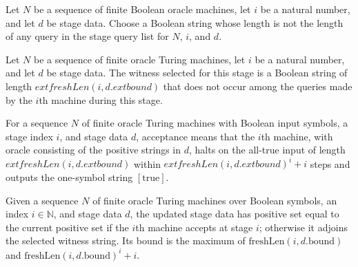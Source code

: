 \begin{definition}
\label{Complexity.stageWit}
\leanok
{}
Let $N$ be a sequence of finite Boolean oracle machines, let $i$ be a natural number,
and let $d$ be stage data. Choose a Boolean string whose length is not the length of any
query in the stage query list for $N$, $i$, and $d$.
\end{definition}

\begin{theorem}
\label{Complexity.stageWit_spec}
\leanok
{}
Let $N$ be a sequence of finite oracle Turing machines, let $i$ be a natural number, and
let $d$ be stage data. The witness selected for this stage is a Boolean string of length
$	ext{freshLen}(i,d.	ext{bound})$ that does not occur among the queries made by the
$i$th machine during this stage.
\end{theorem}

\begin{definition}
\label{Complexity.StageAccepts}
\leanok
{}
For a sequence $N$ of finite oracle Turing machines with Boolean input symbols, a stage
index $i$, and stage data $d$, acceptance means that the $i$th machine, with oracle
consisting of the positive strings in $d$, halts on the all-true input of length
$	ext{freshLen}(i,d.	ext{bound})$ within $	ext{freshLen}(i,d.	ext{bound})^i+i$ steps and
outputs the one-symbol string $[\mathrm{true}]$.
\end{definition}

\begin{definition}
\label{Complexity.stageStep}
\leanok
{}
Given a sequence $N$ of finite oracle Turing machines over Boolean symbols, an index
$i\in\mathbb N$, and stage data $d$, the updated stage data has positive set equal to
the current positive set if the $i$th machine accepts at stage $i$; otherwise it adjoins
the selected witness string. Its bound is the maximum of
$\text{freshLen}(i,d.\text{bound})$ and $\text{freshLen}(i,d.\text{bound})^i+i$.
\end{definition}

